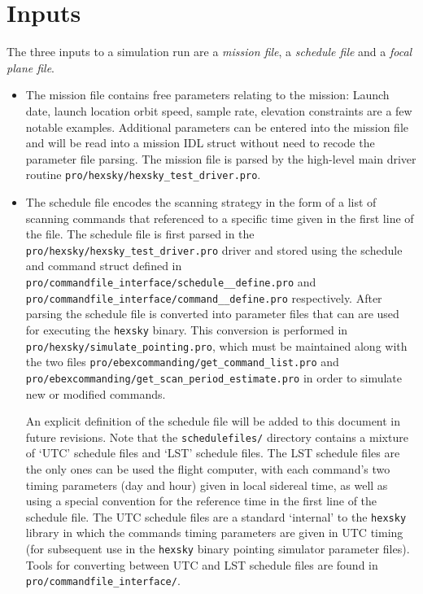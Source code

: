 \documentclass[a4paper,10pt]{article}
\begin{document}
\section{Inputs}

The three inputs to a simulation run are a \emph{mission file}, a
\emph{schedule file} and a \emph{focal plane file}.

\begin{itemize}
\item The mission file contains free parameters relating to the mission:
Launch date, launch location orbit speed, sample rate, elevation
constraints are a few notable examples. Additional parameters can be
entered into the mission file and will be read into a mission IDL
struct without need to recode the parameter file parsing. The mission
file is parsed by the high-level main driver routine
\texttt{pro/hexsky/hexsky\_test\_driver.pro}.

\item The schedule file encodes the scanning strategy in the form of a
list of scanning commands that referenced to a specific time given in
the first line of the file. The schedule file is first parsed in
the \texttt{pro/hexsky/hexsky\_test\_driver.pro} driver and stored
using the schedule and command struct defined in
\texttt{pro/commandfile\_interface/schedule\_\_define.pro} and
\texttt{pro/commandfile\_interface/command\_\_define.pro}
respectively. After parsing the schedule file is converted into
parameter files that can are used for executing the \texttt{hexsky}
binary. This conversion is performed in
\texttt{pro/hexsky/simulate\_pointing.pro}, which must be maintained
along with the two files
\texttt{pro/ebexcommanding/get\_command\_list.pro} and
\texttt{pro/ebexcommanding/get\_scan\_period\_estimate.pro} in order
to simulate new or modified commands.

An explicit definition of the schedule file will be added to this
document in future revisions. Note that the \texttt{schedulefiles/}
directory contains a mixture of `UTC' schedule files and `LST'
schedule files. The LST schedule files are the only ones can be used
the flight computer, with each command's two timing parameters (day
and hour) given in local sidereal time, as well as using a special
convention for the reference time in the first line of the schedule file.
The UTC schedule files are a
standard `internal' to the \texttt{hexsky} library in which the
commands timing parameters are given in UTC timing (for subsequent use in the
\texttt{hexsky} binary pointing simulator parameter files). Tools for converting between
UTC and LST schedule files are found in \texttt{pro/commandfile\_interface/}.


\end{itemize}
\end{document}
